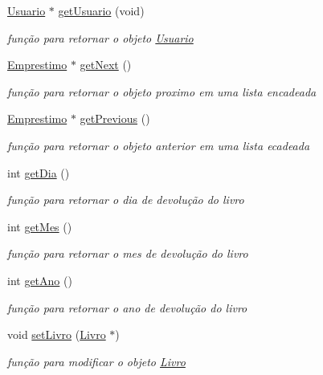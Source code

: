 \begin{DoxyCompactItemize}
\hyperlink{class_usuario}{Usuario} $\ast$ \hyperlink{class_emprestimo_ad049b5c858bf11c26df0417faf4d0a0a}{get\+Usuario} (void)
\begin{DoxyCompactList}\small\item\em função para retornar o objeto \hyperlink{class_usuario}{Usuario} \end{DoxyCompactList}\item 
\hyperlink{class_emprestimo}{Emprestimo} $\ast$ \hyperlink{class_emprestimo_abf2c1c517edcf68121f790ea6516db8f}{get\+Next} ()
\begin{DoxyCompactList}\small\item\em função para retornar o objeto proximo em uma lista encadeada \end{DoxyCompactList}\item 
\hyperlink{class_emprestimo}{Emprestimo} $\ast$ \hyperlink{class_emprestimo_a01db0d6d53d8bcc359a0ff89bb6e43e2}{get\+Previous} ()
\begin{DoxyCompactList}\small\item\em função para retornar o objeto anterior em uma lista ecadeada \end{DoxyCompactList}\item 
int \hyperlink{class_emprestimo_a42220fac9fa79bf33b6caa60128dbfe7}{get\+Dia} ()
\begin{DoxyCompactList}\small\item\em função para retornar o dia de devolução do livro \end{DoxyCompactList}\item 
int \hyperlink{class_emprestimo_a80456349d79e0a78085622ffcb0b737d}{get\+Mes} ()
\begin{DoxyCompactList}\small\item\em função para retornar o mes de devolução do livro \end{DoxyCompactList}\item 
int \hyperlink{class_emprestimo_a781b58a23822c60a3881ff889c70b59c}{get\+Ano} ()
\begin{DoxyCompactList}\small\item\em função para retornar o ano de devolução do livro \end{DoxyCompactList}\item 
void \hyperlink{class_emprestimo_a22f0c42b4b19198df0f82fd597cb4c90}{set\+Livro} (\hyperlink{class_livro}{Livro} $\ast$)
\begin{DoxyCompactList}\small\item\em função para modificar o objeto \hyperlink{class_livro}{Livro} \end{DoxyCompactList}\item 

\end{DoxyCompactItemize}
